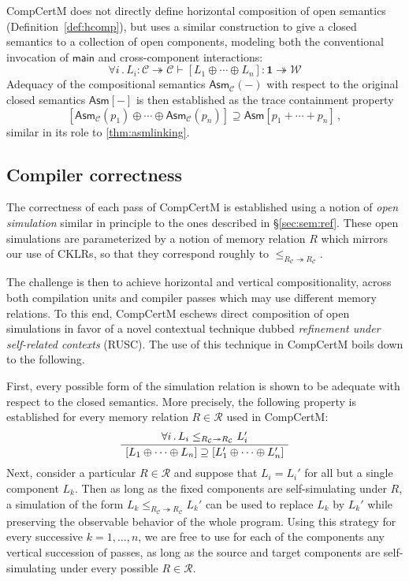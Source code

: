 \documentclass[sigplan,screen]{acmart}
\newcommand{\kw}[1]{\ensuremath{ \mathsf{#1} }}
\newenvironment{optional}{}{}
\begin{document}
\begin{optional}
CompCertM does not directly define horizontal composition
of open semantics (Definition~\ref{def:hcomp}),
but uses a similar construction
to give a closed semantics to a collection of open components,
modeling both the conventional invocation of $\kw{main}$
and cross-component interactions:
\[
  \forall i \,.\,
  L_i : \mathcal{C} \twoheadrightarrow \mathcal{C} \vdash
  [L_1 \oplus \cdots \oplus L_n] : \mathbf{1} \twoheadrightarrow \mathcal{W}
\]
Adequacy of the compositional semantics $\kw{Asm}_\mathcal{C}(-)$
with respect to the original closed semantics $\kw{Asm}[-]$
is then established as the trace containment property
\begin{equation} \label{eqn:asmadeq}
  [\kw{Asm}_\mathcal{C}(p_1) \oplus \cdots \oplus \kw{Asm}_\mathcal{C}(p_n)] \supseteq
  \kw{Asm}[p_1 + \cdots + p_n]
  \,,
\end{equation}
similar in its role to \autoref{thm:asmlinking}.


\subsection{Compiler correctness} %

The correctness of each pass of CompCertM
is established using a notion of \emph{open simulation}
similar in principle to the ones described in \S\ref{sec:sem:ref}.
These open simulations
are parameterized by a notion of memory relation $R$
which mirrors our use of CKLRs,
so that they correspond roughly to
$\le_{R_\mathcal{C} \twoheadrightarrow R_\mathcal{C}}$.

The challenge is then to achieve
horizontal and vertical compositionality,
across both compilation units and compiler passes
which may use different memory relations.
To this end,
CompCertM eschews direct composition of open simulations
in favor of a novel contextual technique dubbed
\emph{refinement under self-related contexts} (RUSC).
The use of this technique in CompCertM boils down to the following.

First,
every possible form of the simulation relation
is shown to be adequate with respect to the closed semantics.
More precisely,
the following property is established
for every memory relation $R \in \mathcal{R}$
used in CompCertM:
\begin{equation} \label{eqn:simadeq}
  \AxiomC{$\forall i \,.\,
    L_i \le_{R_\mathcal{C} \twoheadrightarrow R_\mathcal{C}} L_i'$}
  \UnaryInfC{$
    [L_1  \oplus \cdots \oplus L_n] \supseteq
    [L_1' \oplus \cdots \oplus L_n']$}
  \DisplayProof
\end{equation}
Next,
consider a particular $R \in \mathcal{R}$
and suppose that $L_i = L_i'$
for all but a single component $L_k$.
Then
as long as the fixed components are self-simulating under $R$,
a simulation of the form
$L_k \le_{R_\mathcal{C} \twoheadrightarrow R_\mathcal{C}} L_k'$
can be used to replace $L_k$ by $L_k'$
while preserving the observable behavior of the whole program.
Using this strategy for every successive $k = 1, \ldots, n$,
we are free to use for each of the components
any vertical succession of passes,
as long as the source and target components
are self-simulating under every possible $R \in \mathcal{R}$.


\end{optional}
\end{document}
